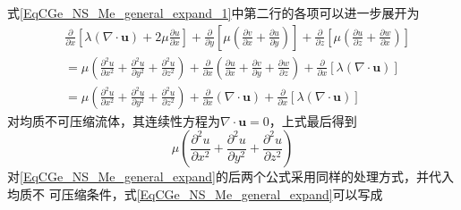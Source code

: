 式\eqref{EqCGe_NS_Me_general_expand_1}中第二行的各项可以进一步展开为
\begin{equation}
  \begin{aligned}
&\frac{\partial }{\partial x}
\left[
  \lambda(\nabla\cdot\mathbf{u}) + 2\mu\frac{\partial u}{\partial x}
\right]
+\frac{\partial }{\partial y}
\left[
  \mu
  \left(
    \frac{\partial v}{\partial x}+\frac{\partial u}{\partial y}
  \right)
\right]
+\frac{\partial }{\partial z}
\left[
  \mu
  \left(
    \frac{\partial u}{\partial z}+\frac{\partial w}{\partial x}
  \right)
\right]
\\
&=
\mu
\left(
  \frac{\partial^{2} u}{\partial x^{2}} +
  \frac{\partial^{2} u}{\partial y^{2}} +
  \frac{\partial^{2} u}{\partial z^{2}}
\right)
+
\frac{\partial}{\partial x}
\left(
  \frac{\partial u}{\partial x} +
  \frac{\partial v}{\partial y} +
  \frac{\partial w}{\partial z}
\right)
+
\frac{\partial}{\partial x}[\lambda(\nabla\cdot\mathbf{u})]
\\
&=
\mu
\left(
  \frac{\partial^{2} u}{\partial x^{2}} +
  \frac{\partial^{2} u}{\partial y^{2}} +
  \frac{\partial^{2} u}{\partial z^{2}}
\right)
+
\frac{\partial}{\partial x}
\left(
  \nabla\cdot\mathbf{u}
\right)
+
\frac{\partial}{\partial x}[\lambda(\nabla\cdot\mathbf{u})]
  \end{aligned}
\end{equation}
对均质不可压缩流体，其连续性方程为$\nabla\cdot\mathbf{u}=0$，上式最后得到
\begin{equation}
  \mu
  \left(
    \frac{\partial^{2} u}{\partial x^{2}} +
    \frac{\partial^{2} u}{\partial y^{2}} +
    \frac{\partial^{2} u}{\partial z^{2}}
  \right)
\end{equation}
对\eqref{EqCGe_NS_Me_general_expand}的后两个公式采用同样的处理方式，并代入均质不
可压缩条件，式\eqref{EqCGe_NS_Me_general_expand}可以写成
